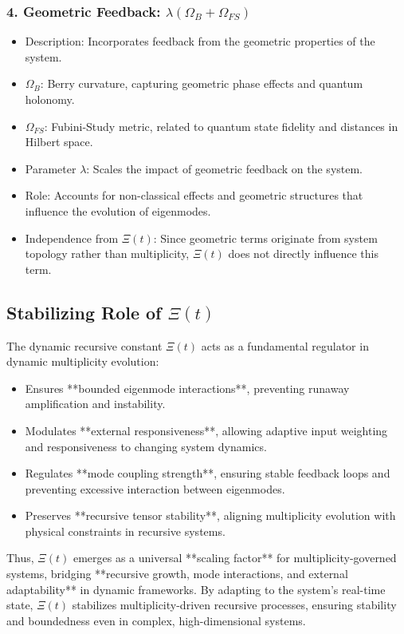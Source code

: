 \documentclass{article}
\theoremstyle{plain}
\begin{document}
\subsubsection{4. Geometric Feedback: \( \lambda (\Omega_B + \Omega_{FS}) \)}
\begin{itemize}
    \item Description: Incorporates feedback from the geometric properties of the system.
    \item \( \Omega_B \): Berry curvature, capturing geometric phase effects and quantum holonomy.
    \item \( \Omega_{FS} \): Fubini-Study metric, related to quantum state fidelity and distances in Hilbert space.
    \item Parameter \( \lambda \): Scales the impact of geometric feedback on the system.
    \item Role: Accounts for non-classical effects and geometric structures that influence the evolution of eigenmodes.
    \item Independence from \(\Xi(t) \): Since geometric terms originate from system topology rather than multiplicity, \(\Xi(t) \) does not directly influence this term.
\end{itemize}

\subsection{Stabilizing Role of \(\Xi(t) \)}

The dynamic recursive constant \(\Xi(t) \) acts as a fundamental regulator in dynamic multiplicity evolution:

\begin{itemize}
    \item Ensures **bounded eigenmode interactions**, preventing runaway amplification and instability.
    \item Modulates **external responsiveness**, allowing adaptive input weighting and responsiveness to changing system dynamics.
    \item Regulates **mode coupling strength**, ensuring stable feedback loops and preventing excessive interaction between eigenmodes.
    \item Preserves **recursive tensor stability**, aligning multiplicity evolution with physical constraints in recursive systems.
\end{itemize}

Thus, \(\Xi(t) \) emerges as a universal **scaling factor** for multiplicity-governed systems, bridging **recursive growth, mode interactions, and external adaptability** in dynamic frameworks. By adapting to the system's real-time state, \(\Xi(t) \) stabilizes multiplicity-driven recursive processes, ensuring stability and boundedness even in complex, high-dimensional systems.
\end{document}

